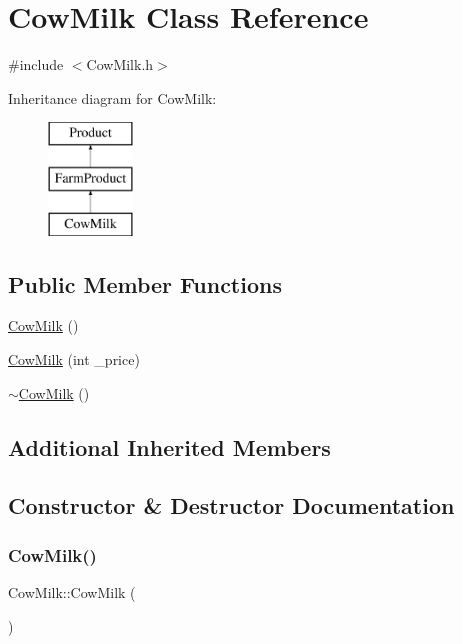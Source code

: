 \hypertarget{classCowMilk}{}\section{Cow\+Milk Class Reference}
\label{classCowMilk}


{\ttfamily \#include $<$Cow\+Milk.\+h$>$}

Inheritance diagram for Cow\+Milk\+:\begin{figure}[H]
\begin{center}
\leavevmode
\includegraphics[height=3.000000cm]{classCowMilk}
\end{center}
\end{figure}
\subsection*{Public Member Functions}
\begin{DoxyCompactItemize}
\item 
\mbox{\hyperlink{classCowMilk_a513ad82f58575fae42790d3d18af0c52}{Cow\+Milk}} ()
\item 
\mbox{\hyperlink{classCowMilk_a34675ff493e61ca45c96d3c3fc1e195a}{Cow\+Milk}} (int \+\_\+price)
\item 
\mbox{\hyperlink{classCowMilk_ab9feca71e5a4f4bcb54c526f20d1c6dc}{$\sim$\+Cow\+Milk}} ()
\end{DoxyCompactItemize}
\subsection*{Additional Inherited Members}


\subsection{Constructor \& Destructor Documentation}
\mbox{\label{classCowMilk_a513ad82f58575fae42790d3d18af0c52}} 
\subsubsection{\texorpdfstring{CowMilk()}{CowMilk()}\hspace{0.1cm}{\footnotesize\ttfamily [1/2]}}
{\footnotesize\ttfamily Cow\+Milk\+::\+Cow\+Milk (\begin{DoxyParamCaption}{ }\end{DoxyParamCaption})}

